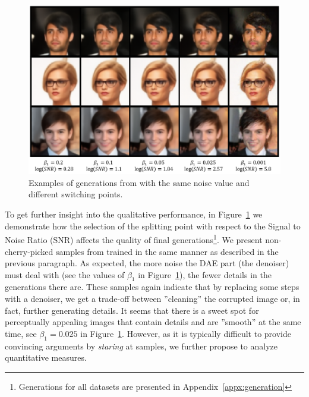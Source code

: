 \begin{figure}
    \begin{adjustbox}{center}
    \includegraphics[width=0.8\linewidth]{pics/4_daed/experiments/daed_generations.png}
    \end{adjustbox}
    \caption{Examples of generations from \ours{} with the same noise value and different switching points.}
    \label{fig:daed_generations} 
    \end{figure}

To get further insight into the qualitative performance, in Figure~\ref{fig:daed_generations} we demonstrate how the selection of the splitting point with respect to the Signal to Noise Ratio (SNR) affects the quality of final generations\footnote{Generations for all datasets are presented in Appendix~\ref{appx:generation}}. We present non-cherry-picked samples from \ours{} trained in the same manner as described in the previous paragraph. As expected, the more noise the DAE part (the denoiser) must deal with (see the values of $\beta_1$ in Figure~\ref{fig:daed_generations}), the fewer details in the generations there are. These samples again indicate that by replacing some steps with a denoiser, we get a trade-off between ''cleaning'' the corrupted image or, in fact, further generating details. It seems that there is a sweet spot for perceptually appealing images that contain details and are ''smooth'' at the same time, see $\beta_1=0.025$ in Figure~\ref{fig:daed_generations}. However, as it is typically difficult to provide convincing arguments by \textit{staring} at samples, we further propose to analyze quantitative measures.


